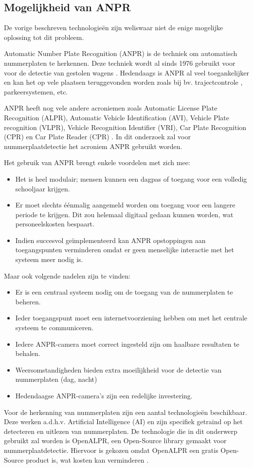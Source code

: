 \subsection{Mogelijkheid van ANPR}
De vorige beschreven technologieën zijn weliswaar niet de enige mogelijke oplossing tot dit probleem.

Automatic Number Plate Recognition (ANPR) is de techniek om automatisch nummerplaten te herkennen. Deze techniek wordt al sinds 1976 gebruikt voor voor de detectie van gestolen wagens \autocite{uk2011anpr}. Hedendaags is ANPR al veel toegankelijker en kan het op vele plaatsen teruggevonden worden zoals bij bv. trajectcontrole \autocite{de2014snelheidscamera}, parkeersystemen, etc.
\par
ANPR heeft nog vele andere acroniemen zoals Automatic License Plate Recognition (ALPR), Automatic Vehicle Identification (AVI), Vehicle Plate recognition (VLPR), Vehicle Recognition Identifier (VRI), Car Plate Recognition (CPR) en Car Plate Reader (CPR) \autocite{axis2019license}. In dit onderzoek zal voor nummerplaatdetectie het acroniem ANPR gebruikt worden.
\par
Het gebruik van ANPR brengt enkele voordelen met zich mee:
\begin{itemize}
	\item Het is heel modulair; mensen kunnen een dagpas of toegang voor een volledig schooljaar krijgen.
	\item Er moet slechts éénmalig aangemeld worden om toegang voor een langere periode te krijgen. Dit zou helemaal digitaal gedaan kunnen worden, wat personeelskosten bespaart.
	\item Indien succesvol geïmplementeerd kan ANPR opstoppingen aan toegangspunten verminderen omdat er geen menselijke interactie met het systeem meer nodig is.
\end{itemize}
\par
Maar ook volgende nadelen zijn te vinden:
\begin{itemize}
	\item Er is een centraal systeem nodig om de toegang van de nummerplaten te beheren.
	\item Ieder toegangspunt moet een internetvoorziening hebben om met het centrale systeem te communiceren.
	\item Iedere ANPR-camera moet correct ingesteld zijn om haalbare resultaten te behalen.
	\item Weersomstandigheden bieden extra moeilijkheid voor de detectie van nummerplaten (dag, nacht)
	\item Hedendaagse ANPR-camera's zijn een redelijke investering.
\end{itemize}
\par
Voor de herkenning van nummerplaten zijn een aantal technologieën beschikbaar. Deze werken a.d.h.v. Artificial Intelligence (AI) en zijn specifiek getraind op het detecteren en uitlezen van nummerplaten.
De technologie die in dit onderwerp gebruikt zal worden is OpenALPR, een Open-Source library gemaakt voor nummerplaatdetectie. Hiervoor is gekozen omdat OpenALPR een gratis Open-Source product is, wat kosten kan verminderen \autocite{openalprgithub}.


